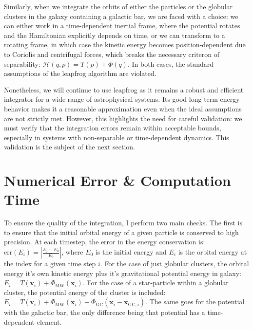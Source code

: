     Similarly, when we integrate the orbits of either the particles or the globular clusters in the galaxy containing a galactic bar, we are faced with a choice: we can either work in a time-dependent inertial frame, where the potential rotates and the Hamiltonian explicitly depends on time, or we can transform to a rotating frame, in which case the kinetic energy becomes position-dependent due to Coriolis and centrifugal forces, which breaks the necessary criteron of separability: $\mathcal{H}(q,p) = T(p)+\Phi(q)$. In both cases, the standard assumptions of the leapfrog algorithm are violated.

    Nonetheless, we will continue to use leapfrog as it remains a robust and efficient integrator for a wide range of astrophysical systems. Its good long-term energy behavior makes it a reasonable approximation even when the ideal assumptions are not strictly met. However, this highlights the need for careful validation: we must verify that the integration errors remain within acceptable bounds, especially in systems with non-separable or time-dependent dynamics. This validation is the subject of the next section.


\section{Numerical Error \& Computation Time}

    To ensure the quality of the integration, I perform two main checks. The first is to ensure that the initial orbital energy of a given particle is conserved to high precision. At each timestep, the error in the energy conservation is: $
    \mathrm{err}(E_i) = \left|\frac{E_i - E_0}{E_0}\right|$, where $E_0$ is the initial energy and $E_i$ is the orbital energy at the index for a given time step $i$. For the case of just globular clusters, the orbital energy it's own kinetic energy plus it's gravitational potential energy in galaxy: $E_i = T(\textbf{v}_i) + \Phi_{\mathrm{MW}}\left(\textbf{x}_i\right)$. For the case of a star-particle within a globular cluster, the potential energy of the cluster is included: $E_i = T(\textbf{v}_i) + \Phi_{\mathrm{MW}}\left(\textbf{x}_i\right) + \Phi_\mathrm{GC}\left(\textbf{x}_i - \textbf{x}_{\mathrm{GC},i}\right)$. The same goes for the potential with the galactic bar, the only difference being that potential has a time-dependent element. 

